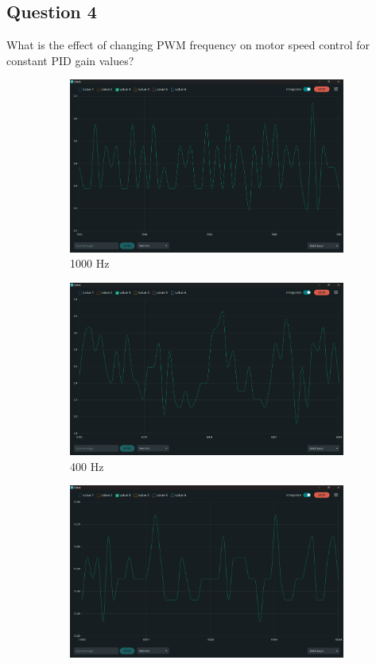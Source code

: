 \documentclass[12pt]{article}
\begin{document}
\subsection{Question 4}
What is the effect of changing PWM frequency on motor speed control for constant PID gain 
values?

\begin{figure}[h]
    \centering
    \begin{subfigure}{.49\textwidth}
        \centering
        \includegraphics[width=0.95\linewidth]{images/q4/1000Hz.png} 
		\caption{1000 Hz}
    \end{subfigure}
    \begin{subfigure}{.49\textwidth}
        \centering
        \includegraphics[width=0.95\linewidth]{images/q4/400Hz.png}
		\caption{400 Hz}
    \end{subfigure}
    \begin{subfigure}{.49\textwidth}
        \centering
        \includegraphics[width=0.95\linewidth]{images/q4/200Hz.png} 

\end{subfigure}
\end{figure}
\end{document}
